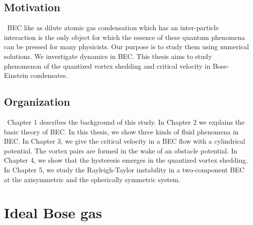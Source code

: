 \documentclass[12pt,a4paper]{report} %
\begin{document}
\section{Motivation}
\ BEC like as dilute atomic gas condensation which has an inter-particle interaction
is the only object for which the essence of 
these quantum phenomena can be pressed for many physicists.
Our purpose is to study them using numerical solutions.
We investigate dynamics in BEC.
This thesis aims to study phenomenon of the quantized vortex shedding
and critical velocity in Bose-Einstein condensates.

\section{Organization}
\ Chapter 1 describes the background of this study.
In Chapter 2 we explains the basic theory of BEC.
In this thesis, we show three kinds of fluid phenomena in BEC.
In Chapter 3, we give the critical velocity in a BEC flow with 
 a cylindrical potential. The vortex pairs are formed in the wake of an obstacle potential.
In Chapter 4, we show that the hysteresis emerges in the quantized vortex shedding.
In Chapter 5, we study the Rayleigh-Taylor instability in a two-component BEC at 
the axisymmetric and the spherically symmetric system.

\chapter{Ideal Bose gas}
\end{document}
